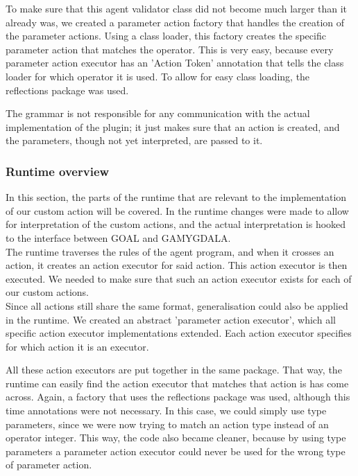 To make sure that this agent validator class did not become much larger than it already was, we created a parameter action factory that handles the creation of the parameter actions. Using a class loader, this factory creates the specific parameter action that matches the operator. This is very easy, because every parameter action executor has an 'Action Token' annotation that tells the class loader for which operator it is used. To allow for easy class loading, the reflections package was used.

The grammar is not responsible for any communication with the actual implementation of the plugin; it just makes sure that an action is created, and the parameters, though not yet interpreted, are passed to it.

\subsubsection{Runtime overview}
In this section, the parts of the runtime that are relevant to the implementation of our custom action will be covered. In the runtime changes were made to allow for interpretation of the custom actions, and the actual interpretation is hooked to the interface between GOAL and GAMYGDALA. \\ 

The runtime traverses the rules of the agent program, and when it crosses an action, it creates an action executor for said action. This action executor is then executed. We needed to make sure that such an action executor exists for each of our custom actions. \\

Since all actions still share the same format, generalisation could also be applied  in the runtime. We created an abstract 'parameter action executor', which all specific action executor implementations extended. Each action executor specifies for which action it is an executor.

All these action executors are put together in the same package. That way, the runtime can easily find the action executor that matches that action is has come across. Again, a factory that uses the reflections package was used, although this time annotations were not necessary. In this case, we could simply use type parameters, since we were now trying to match an action type instead of an operator integer. This way, the code also became cleaner, because by using type parameters a parameter action executor could never be used for the wrong type of parameter action.


